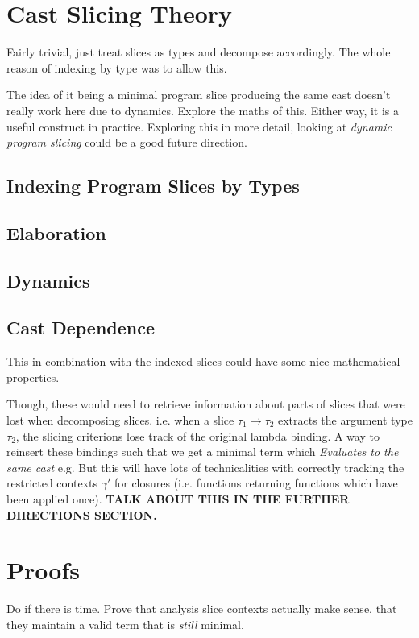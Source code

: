 \section{Cast Slicing Theory}\label{sec:CastSlicingTheory}

Fairly trivial, just treat slices as types and decompose accordingly. The whole reason of indexing by type was to allow this.

The idea of it being a minimal program slice producing the same cast doesn't really work here due to dynamics. Explore the maths of this. Either way, it is a useful construct in practice. Exploring this in more detail, looking at \textit{dynamic program slicing} could be a good future direction.


\subsection{Indexing Program Slices by Types}


\subsection{Elaboration}

\subsection{Dynamics}

\subsection{Cast Dependence}
This in combination with the indexed slices could have some nice mathematical properties.

Though, these would need to retrieve information about parts of slices that were lost when decomposing slices. i.e. when a slice $\tau_1 \to \tau_2$ extracts the argument type $\tau_2$, the slicing criterions lose track of the original lambda binding. A way to reinsert these bindings such that we get a minimal term which \textit{Evaluates to the same cast} e.g. But this will have lots of technicalities with correctly tracking the restricted contexts $\gamma'$ for closures (i.e. functions returning functions which have been applied once). \textbf{TALK ABOUT THIS IN THE FURTHER DIRECTIONS SECTION.}

\section{Proofs}\label{sec:Proofs}
Do if there is time. Prove that analysis slice contexts actually make sense, that they maintain a valid term that is \textit{still} minimal.

